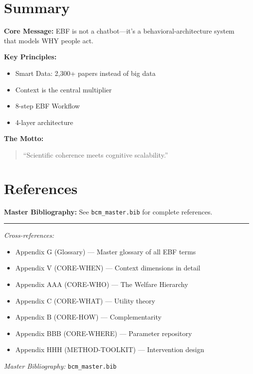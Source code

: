 \section{Summary}
\label{sec:ref-ebf-summary}

\begin{tcolorbox}[colback=green!10!white, colframe=green!75!black,
    title=\textbf{Appendix BL: Summary}]

\textbf{Core Message:} EBF is not a chatbot---it's a behavioral-architecture
system that models WHY people act.

\textbf{Key Principles:}
\begin{itemize}[nosep]
\item Smart Data: 2,300+ papers instead of big data
\item Context is the central multiplier
\item 8-step EBF Workflow
\item 4-layer architecture
\end{itemize}

\textbf{The Motto:}
\begin{quote}
``Scientific coherence meets cognitive scalability.''
\end{quote}

\end{tcolorbox}


\section{References}
\label{sec:ref-ebf-references}

\nocite{bcm_master}

\begin{tcolorbox}[colback=blue!5!white, colframe=blue!75!black]
\textbf{Master Bibliography:} See \texttt{bcm\_master.bib} for complete references.
\end{tcolorbox}

\vspace{1em}
\hrule
\vspace{0.5em}

\noindent\textit{Cross-references:}
\begin{itemize}[nosep]
\item Appendix G (Glossary) --- Master glossary of all EBF terms
\item Appendix V (CORE-WHEN) --- Context dimensions in detail
\item Appendix AAA (CORE-WHO) --- The Welfare Hierarchy
\item Appendix C (CORE-WHAT) --- Utility theory
\item Appendix B (CORE-HOW) --- Complementarity
\item Appendix BBB (CORE-WHERE) --- Parameter repository
\item Appendix HHH (METHOD-TOOLKIT) --- Intervention design
\end{itemize}

\noindent\textit{Master Bibliography:} \texttt{bcm\_master.bib}

